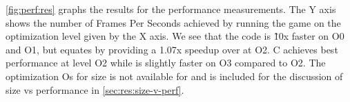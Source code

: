 \autoref{fig:perf:res} graphs the results for the performance measurements.
The Y axis shows the number of Frames Per Seconds achieved by running the game on the optimization level given by the X axis.
We see that the {\C} code is \~10x faster on O0 and O1, but {\rust} equates by providing a 1.07x speedup over {\C} at O2.
C achieves best performance at level O2 while {\rust} is slightly faster on O3 compared to O2.
The optimization Os for size is not available for {\rust} and is included for the discussion of size vs performance in \autoref{sec:res:size-v-perf}.

